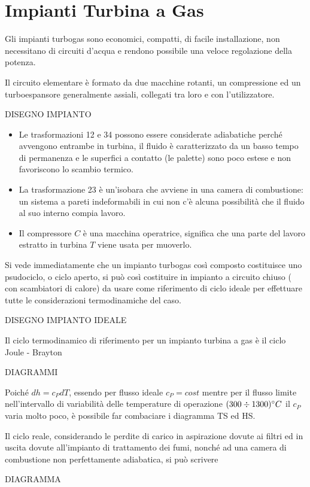 \part{Impianti Turbina a Gas}
\begin{adjustwidth}{2in}{}
	Gli impianti turbogas sono economici, compatti, di facile installazione, non necessitano di circuiti d'acqua e rendono possibile una veloce regolazione della potenza. \newline 
	
	Il circuito elementare è formato da due macchine rotanti, un compressione ed un turboespansore generalmente assiali, collegati tra loro e con l'utilizzatore. 
	
	DISEGNO IMPIANTO
	\begin{itemize}		
		\item Le trasformazioni 12 e 34 possono essere considerate adiabatiche perché avvengono entrambe in turbina, il fluido è caratterizzato da un basso tempo di permanenza e le superfici a contatto (le palette) sono poco estese e non favoriscono lo scambio termico. 
		
		\item La trasformazione 23 è un'isobara che avviene in una camera di combustione: un sistema a pareti indeformabili in cui non c'è alcuna possibilità che il fluido al suo interno compia lavoro. 
		
		\item Il compressore $C$ è una macchina operatrice, significa che una parte del lavoro estratto in turbina $T$ viene usata per muoverlo. 
	\end{itemize} 
	
	\vspace{0.5cm}
	
	Si vede immediatamente che un impianto turbogas così composto costituisce uno psudociclo, o ciclo aperto, si può così costituire in impianto a circuito chiuso ( con scambiatori di calore) da usare come riferimento di ciclo ideale per effettuare tutte le considerazioni termodinamiche del caso. 
	
	DISEGNO IMPIANTO IDEALE 
	
	Il ciclo termodinamico di riferimento per un impianto turbina a gas è il ciclo Joule - Brayton
	
	DIAGRAMMI
	
	Poiché $dh = c_PdT$, essendo per flusso ideale $c_P = cost$ mentre per il flusso limite nell'intervallo di variabilità delle temperature di operazione $(300\div1300)\degree C$ il $c_P$ varia molto poco, è possibile far combaciare i diagramma TS ed HS. \newline 
	
	Il ciclo reale, considerando le perdite di carico in aspirazione dovute ai filtri ed in uscita dovute all'impianto di trattamento dei fumi, nonché ad una camera di combustione non perfettamente adiabatica, si può scrivere 
	
	DIAGRAMMA 
\end{adjustwidth}

